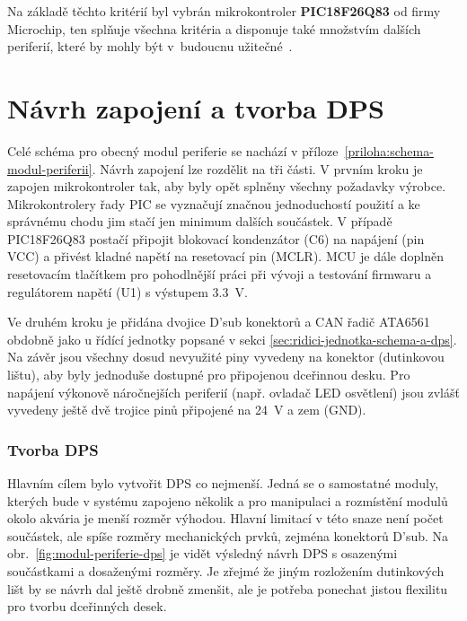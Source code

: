         Na základě těchto kritérií byl vybrán mikrokontroler \textbf{PIC18F26Q83} od firmy Microchip, ten splňuje všechna kritéria a disponuje také množstvím dalších periferií, které by mohly být v~budoucnu užitečné~\cite{PIC18F26Q83}.

    \section{Návrh zapojení a tvorba DPS}
        Celé schéma pro obecný modul periferie se nachází v příloze~\ref{priloha:schema-modul-periferii}. Návrh zapojení lze rozdělit na tři části. V prvním kroku je zapojen mikrokontroler tak, aby byly opět splněny všechny požadavky výrobce. Mikrokontrolery řady PIC se vyznačují značnou jednoduchostí použití a ke správnému chodu jim stačí jen minimum dalších součástek. V případě PIC18F26Q83 postačí připojit blokovací kondenzátor (C6) na napájení (pin VCC) a přivést kladné napětí na resetovací pin (MCLR). MCU je dále doplněn resetovacím tlačítkem pro pohodlnější práci při vývoji a testování firmwaru a regulátorem napětí (U1) s výstupem \qty{3.3}{V}. 

        Ve druhém kroku je přidána dvojice D'sub konektorů a CAN řadič ATA6561 obdobně jako u řídící jednotky popsané v sekci \ref{sec:ridici-jednotka-schema-a-dps}. Na závěr jsou všechny dosud nevyužité piny vyvedeny na konektor (dutinkovou lištu), aby byly jednoduše dostupné pro připojenou dceřinnou desku. Pro napájení výkonově náročnejších periferií (např. ovladač LED osvětlení) jsou zvlášť vyvedeny ještě dvě trojice pinů připojené na \qty{24}{V} a zem (GND).

        \subsubsection{Tvorba DPS}
        Hlavním cílem bylo vytvořit DPS co nejmenší. Jedná se o samostatné moduly, kterých bude v systému zapojeno několik a pro manipulaci a rozmístění modulů okolo akvária je menší rozměr výhodou. Hlavní limitací v této snaze není počet součástek, ale spíše rozměry mechanických prvků, zejména konektorů D'sub. Na obr.~\ref{fig:modul-periferie-dps} je vidět výsledný návrh DPS s osazenými součástkami a dosaženými rozměry. Je zřejmé že jiným rozložením dutinkových lišt by se návrh dal ještě drobně zmenšit, ale je potřeba ponechat jistou flexilitu pro tvorbu dceřinných desek.

